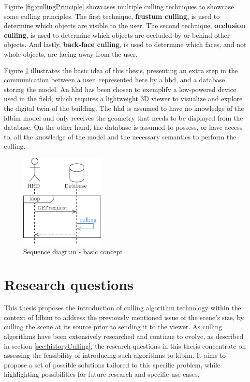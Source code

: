 Figure \ref{fig:cullingPrinciple} showcases multiple culling techniques to showcase some culling principles. The first technique, \textbf{frustum culling}, is used to determine which objects are visible to the user. The second technique, \textbf{occlusion culling}, is used to determine which objects are occluded by or behind other objects. And lastly, \textbf{back-face culling}, is used to determine which faces, and not whole objects, are facing away from the user.

Figure \ref{fig:firstIdea} illustrates the basic idea of this thesis, presenting an extra step in the communication between a user, represented here by a \ac{hhd}, and a database storing the model. An \ac{hhd} has been chosen to exemplify a low-powered device used in the field, which requires a lightweight 3D viewer to visualize and explore the digital twin of the building. The \ac{hhd} is assumed to have no knowledge of the \ac{ldbim} model and only receives the geometry that needs to be displayed from the database. On the other hand, the database is assumed to possess, or have access to, all the knowledge of the model and the necessary semantics to perform the culling.

\begin{figure}[H]
	\centering
	\includegraphics[width=0.38\textwidth]{figures/pdf/first idea.pdf}
	\caption{Sequence diagram - basic concept}
	\label{fig:firstIdea}
\end{figure}


\section{Research questions}\label{sec:researchQuestions}
This thesis proposes the introduction of culling algorithm technology within the context of \ac{ldbim} to address the previously mentioned issue of the scene's size, by culling the scene at its source prior to sending it to the viewer. As culling algorithms have been extensively researched and continue to evolve, as described in section \ref{sec:historyCulling}, the research questions in this thesis concentrate on assessing the feasibility of introducing such algorithms to \ac{ldbim}. It aims to propose a set of possible solutions tailored to this specific problem, while highlighting possibilities for future research and specific use cases.

